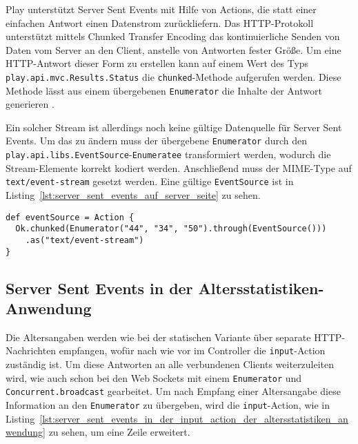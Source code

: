 Play unterstützt Server Sent Events mit Hilfe von Actions, die statt einer einfachen Antwort einen Datenstrom zurückliefern.
Das HTTP-Protokoll unterstützt mittels Chunked Transfer Encoding das kontinuierliche Senden von Daten vom Server an den Client, anstelle von Antworten fester Größe.
Um eine HTTP-Antwort dieser Form zu erstellen kann auf einem Wert des Typs \lstinline|play.api.mvc.Results.Status| die \lstinline|chunked|-Methode aufgerufen werden.
Diese Methode lässt aus einem übergebenen \lstinline|Enumerator| die Inhalte der Antwort generieren \cite{play_streams}.

Ein solcher Stream ist allerdings noch keine gültige Datenquelle für Server Sent Events.
Um das zu ändern muss der übergebene \lstinline|Enumerator| durch den \lstinline|play.api.libs.EventSource|-\lstinline|Enumeratee| transformiert werden, wodurch die Stream-Elemente korrekt kodiert werden.
Anschließend muss der MIME-Type auf \lstinline|text/event-stream| gesetzt werden.
Eine gültige \lstinline|EventSource| ist in Listing~\ref{lst:server_sent_events_auf_server_seite} zu sehen.

\begin{lstlisting}[caption=Server Sent Events auf Server-Seite, label=lst:server_sent_events_auf_server_seite]
def eventSource = Action {
  Ok.chunked(Enumerator("44", "34", "50").through(EventSource()))
    .as("text/event-stream")
}
\end{lstlisting}


\subsection{Server Sent Events in der Altersstatistiken-Anwendung} %
\label{sub:server_sent_events_in_der_altersstatistiken_anwendung}

Die Altersangaben werden wie bei der statischen Variante über separate HTTP-Nachrichten empfangen, wofür nach wie vor im Controller die \lstinline|input|-Action zuständig ist.
Um diese Antworten an alle verbundenen Clients weiterzuleiten wird, wie auch schon bei den Web Sockets mit einem \lstinline|Enumerator| und \lstinline|Concurrent.broadcast| gearbeitet.
Um nach Empfang einer Altersangabe diese Information an den \lstinline|Enumerator| zu übergeben, wird die \lstinline|input|-Action, wie in Listing~\ref{lst:server_sent_events_in_der_input_action_der_altersstatistiken_anwendung} zu sehen, um eine Zeile erweitert.

